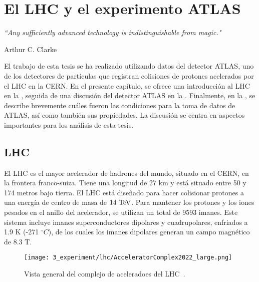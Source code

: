 \chapter{El LHC y el experimento ATLAS}
\label{ch:atlas}
\epigraph{\emph{``Any sufficiently advanced technology is indistinguishable from magic."}}{Arthur C. Clarke}



El trabajo de esta tesis se ha realizado utilizando datos del detector \ac{ATLAS}, uno de los detectores de partículas que registran colisiones de protones acelerados por el \acf{LHC} en la \ac{CERN}.
En el presente capítulo, se ofrece una introducción al \ac{LHC} en la \Sect{\ref{sec:atlas:LHC}}, seguida de una discusión del detector \ac{ATLAS} en la \Sect{\ref{sec:atlas:atlas}}. Finalmente, en la \Sect{\ref{sec:atlas:runs}}, se describe brevemente cuáles fueron las condiciones para la toma de datos de \ac{ATLAS}, así como también sus propiedades. La discusión se centra en aspectos importantes para los análisis de esta tesis.




\section{LHC}
\label{sec:atlas:LHC}

El \ac{LHC} \cite{LHC-TDR,LHC-Machine} es el mayor acelerador de hadrones del mundo, situado en el \ac{CERN}, en la frontera franco-suiza. Tiene una longitud de 27 km y está situado entre 50 y 174 metros bajo tierra.
El \ac{LHC} está diseñado para hacer colisionar protones a una energía de centro de masa de \(14~\text{TeV}\). Para mantener los protones y los iones pesados en el anillo del acelerador, se utilizan un total de 9593 imanes. Este sistema incluye imanes superconductores dipolares y cuadrupolares, enfriados a 1.9 K (-271 $^{\circ} C$), de los cuales los imanes dipolares generan un campo magnético de 8.3 T.

\begin{figure}[ht!]
    \centering
    \texttt{[image: 3\_experiment/lhc/AcceleratorComplex2022\_large.png]}
    \caption{Vista general del complejo de aceleradoes del \ac{LHC}~\cite{LHC-complex}.}
    \label{fig:atlas:lhc:lhc}
\end{figure}

